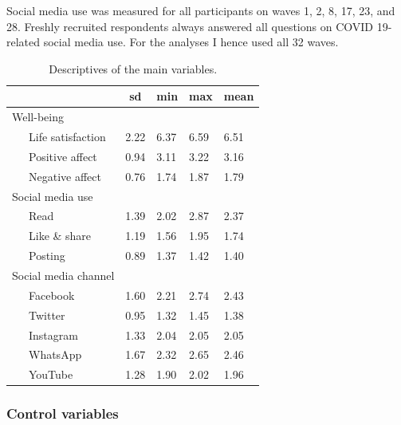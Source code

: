 \documentclass[
  man,mask,floatsintext]{apa7}
\begin{document}
Social media use was measured for all participants on waves 1, 2, 8, 17, 23, and 28.
Freshly recruited respondents always answered all questions on COVID 19-related social media use.
For the analyses I hence used all 32 waves.

\begin{table}[tbp]

\begin{center}
\begin{threeparttable}

\caption{\label{tab:tab-descriptives}Descriptives of the main variables.}

\begin{tabular}{lllll}
\toprule
 & \multicolumn{1}{c}{sd} & \multicolumn{1}{c}{min} & \multicolumn{1}{c}{max} & \multicolumn{1}{c}{mean}\\
\midrule
Well-being &  &  &  & \\
\ \ \ Life satisfaction & 2.22 & 6.37 & 6.59 & 6.51\\
\ \ \ Positive affect & 0.94 & 3.11 & 3.22 & 3.16\\
\ \ \ Negative affect & 0.76 & 1.74 & 1.87 & 1.79\\
Social media use &  &  &  & \\
\ \ \ Read & 1.39 & 2.02 & 2.87 & 2.37\\
\ \ \ Like \& share & 1.19 & 1.56 & 1.95 & 1.74\\
\ \ \ Posting & 0.89 & 1.37 & 1.42 & 1.40\\
Social media channel &  &  &  & \\
\ \ \ Facebook & 1.60 & 2.21 & 2.74 & 2.43\\
\ \ \ Twitter & 0.95 & 1.32 & 1.45 & 1.38\\
\ \ \ Instagram & 1.33 & 2.04 & 2.05 & 2.05\\
\ \ \ WhatsApp & 1.67 & 2.32 & 2.65 & 2.46\\
\ \ \ YouTube & 1.28 & 1.90 & 2.02 & 1.96\\
\bottomrule
\end{tabular}

\end{threeparttable}
\end{center}

\end{table}

\hypertarget{control-variables}{%
\subsubsection{Control variables}\label{control-variables}}
\end{document}
